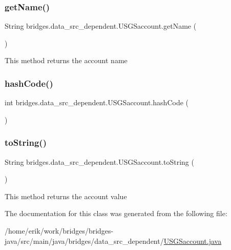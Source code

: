 \subsubsection{\texorpdfstring{get\+Name()}{getName()}}
{\footnotesize\ttfamily String bridges.\+data\+\_\+src\+\_\+dependent.\+U\+S\+G\+Saccount.\+get\+Name (\begin{DoxyParamCaption}{ }\end{DoxyParamCaption})}

This method returns the account name \mbox{\label{classbridges_1_1data__src__dependent_1_1_u_s_g_saccount_afe2cc53d7993aaf4424f42fb535c7ed1}} 
\subsubsection{\texorpdfstring{hash\+Code()}{hashCode()}}
{\footnotesize\ttfamily int bridges.\+data\+\_\+src\+\_\+dependent.\+U\+S\+G\+Saccount.\+hash\+Code (\begin{DoxyParamCaption}{ }\end{DoxyParamCaption})}

\mbox{\label{classbridges_1_1data__src__dependent_1_1_u_s_g_saccount_a832c5a4953a40fd3fa89243fcdabc435}} 
\subsubsection{\texorpdfstring{to\+String()}{toString()}}
{\footnotesize\ttfamily String bridges.\+data\+\_\+src\+\_\+dependent.\+U\+S\+G\+Saccount.\+to\+String (\begin{DoxyParamCaption}{ }\end{DoxyParamCaption})}

This method returns the account value 

The documentation for this class was generated from the following file\+:\begin{DoxyCompactItemize}
\item 
/home/erik/work/bridges/bridges-\/java/src/main/java/bridges/data\+\_\+src\+\_\+dependent/\hyperlink{_u_s_g_saccount_8java}{U\+S\+G\+Saccount.\+java}\end{DoxyCompactItemize}
